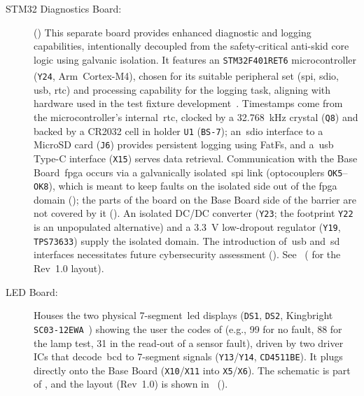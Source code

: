 \begin{description}
	\item[STM32 Diagnostics Board:] () This separate board provides enhanced diagnostic and logging capabilities, intentionally decoupled from the safety-critical anti-skid core logic using galvanic isolation. It features an \texttt{STM32F401RET6} microcontroller (\texttt{Y24}, Arm\textsuperscript{\textregistered}~Cortex\textsuperscript{\textregistered}-M4), chosen for its suitable peripheral set (\gls{spi}, \gls{sdio}, \gls{usb}, \gls{rtc}) and processing capability for the logging task, aligning with hardware used in the test fixture development~\cite{dolata2023}. Timestamps come from the microcontroller's internal~\gls{rtc}, clocked by a \SI{32.768}{\kilo\hertz} crystal (\texttt{Q8}) and backed by a CR2032 cell in holder \texttt{U1} (\texttt{BS-7}); an~\gls{sdio} interface to a MicroSD card (\texttt{J6}) provides persistent logging using FatFs, and a~\gls{usb} Type-C interface (\texttt{X15}) serves data retrieval. Communication with the Base Board~\gls{fpga} occurs via a galvanically isolated~\gls{spi} link (optocouplers \texttt{OK5}--\texttt{OK8}), which is meant to keep faults on the isolated side out of the \gls{fpga} domain (); the parts of the board on the Base Board side of the barrier are not covered by it (). An isolated DC/DC converter (\texttt{Y23}; the footprint \texttt{Y22} is an unpopulated alternative) and a \SI{3.3}{\volt} low-dropout regulator (\texttt{Y19}, \texttt{TPS73633}) supply the isolated domain. The introduction of~\gls{usb} and~\gls{sd} interfaces necessitates future cybersecurity assessment (). See~ ( for the Rev~1.0 layout).

	\item[LED Board:] Houses the two physical 7-segment~\gls{led} displays (\texttt{DS1}, \texttt{DS2}, Kingbright \texttt{SC03-12EWA}~\cite{kingbright2020}) showing the user the codes of  (e.g., 99 for no fault, 88 for the lamp test, 31 in the read-out of a sensor fault), driven by two driver ICs that decode~\gls{bcd} to 7-segment signals (\texttt{Y13}/\texttt{Y14}, \texttt{CD4511BE}). It plugs directly onto the Base Board (\texttt{X10}/\texttt{X11} into \texttt{X5}/\texttt{X6}). The schematic is part of , and the layout (Rev~1.0) is shown in~ ().
\end{description}

